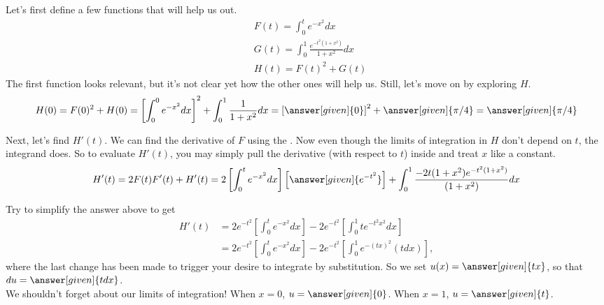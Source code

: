 \documentclass{ximera}
\begin{document}
\begin{exercise}
	Let's first define a few functions that will help us out.
	\begin{align*}
		&F(t)=\int_{0}^{t} e^{-x^2}dx \\
		&G(t)=\int_{0}^{1} \frac{e^{-t^2(1+x^2)}}{1+x^2} dx \\
		&H(t)=F(t)^2+G(t)
	\end{align*}
	The first function looks relevant, but it's not clear yet how the other ones will help us. Still, let's move on by exploring $H$.
	\begin{align*}
	H(0)= F(0)^2+H(0)=\left[\int_{0}^{0} e^{-x^2}dx \right]^2+\int_{0}^{1} \frac{1}{1+x^2} dx = \left[ \answer[given]{0} \right]^2 + \answer[given]{\pi/4} = \answer[given]{\pi/4}
	\end{align*}
	
	Next, let's find $H'(t)$. We can find the derivative of $F$ using the . Now even though the limits of integration in $H$ don't depend on $t$, the integrand does. So to evaluate $H'(t)$, you may simply pull the derivative (with respect to $t$) inside and treat $x$ like a constant.
	\begin{align*}
		H'(t) =2F(t)F'(t)+H'(t) =2 \left[ \int_{0}^{t} e^{-x^2}dx \right] \left[\answer[given]{e^{-t^2}}\right]+\int_{0}^{1} \frac{ -2t(1+x^2) e^{-t^2(1+x^2)}}{(1+x^2)} dx
	\end{align*}
	
	\begin{exercise}
		Try to simplify the answer above to get
		\begin{align*}
			H'(t) &= 2e^{-t^2} \left[ \int_{0}^{t} e^{-x^2}dx \right] -2e^{-t^2} \left[ \int_{0}^{1} t e^{-t^2 x^2} dx \right] \\
			&=2e^{-t^2} \left[ \int_{0}^{t} e^{-x^2}dx \right] -2e^{-t^2} \left[ \int_{0}^{1} e^{-(tx)^2} (tdx) \right],
		\end{align*}
		where the last change has been made to trigger your desire to integrate by substitution. So we set $u(x)=\answer[given]{tx}$, so that $du=\answer[given]{tdx}$. \\
		We shouldn't forget about our limits of integration! When $x=0$, $u=\answer[given]{0}$. When $x=1$, $u=\answer[given]{t}$.
		

\end{exercise}
\end{exercise}
\end{document}

